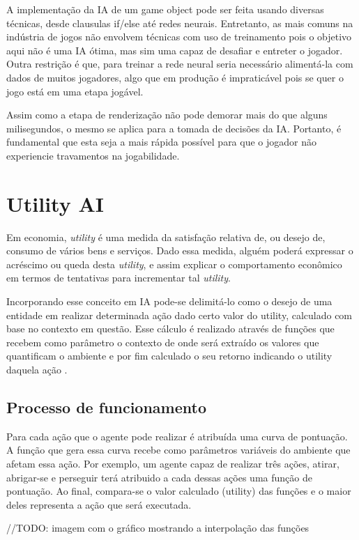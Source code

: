 \documentclass[12pt, 
openright, 
oneside, 
a4paper,    
brazil]{facom-ufu-abntex2}
\begin{document}
A implementação da IA de um game object pode ser feita usando diversas técnicas, desde clausulas if/else até redes neurais. Entretanto, as mais comuns na indústria de jogos não envolvem técnicas com uso de treinamento pois o objetivo aqui não é uma IA ótima, mas sim uma capaz de desafiar e entreter o jogador. Outra restrição é que, para treinar a rede neural seria necessário alimentá-la com dados de muitos jogadores, algo que em produção é impraticável pois se quer o jogo está em uma etapa jogável.

Assim como a etapa de renderização não pode demorar mais do que alguns milisegundos, o mesmo se aplica para a tomada de decisões da IA. Portanto, é fundamental que esta seja a mais rápida possível para que o jogador não experiencie travamentos na jogabilidade.

\section{Utility AI}

Em economia, \textit{utility} é uma medida da satisfação relativa de, ou desejo de, consumo de vários bens e serviços. Dado essa medida, alguém poderá expressar o acréscimo ou queda desta \textit{utility}, e assim explicar o comportamento econômico em termos de tentativas para incrementar tal \textit{utility}.

Incorporando esse conceito em IA pode-se delimitá-lo como o desejo de uma entidade em realizar determinada ação dado certo valor do utility, calculado com base no contexto em questão. Esse cálculo é realizado através de funções que recebem como parâmetro o contexto de onde será extraído os valores que quantificam o ambiente e por fim calculado o seu retorno indicando o utility daquela ação \cite{UtilityAI}.



\subsection{Processo de funcionamento}
Para cada ação que o agente pode realizar é atribuída uma curva de pontuação. A função que gera essa curva recebe como parâmetros variáveis do ambiente que afetam essa ação. Por exemplo, um agente capaz de realizar três ações, atirar, abrigar-se e perseguir terá atribuido a cada dessas ações uma função de pontuação. Ao final, compara-se o valor calculado (utility) das funções e o maior deles representa a ação que será executada.

//TODO: imagem com o gráfico mostrando a interpolação das funções
\end{document}
